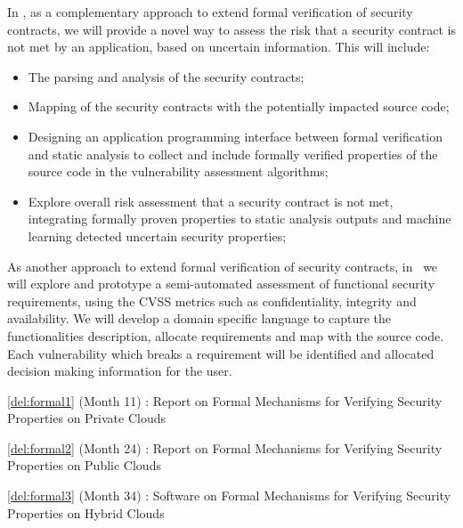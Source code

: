 \begin{Workpackage}{\thewpno}
\begin{Task}
In \theTask, as a complementary approach to extend formal verification of security contracts, we will provide a novel way to assess the risk that a security contract is not met by an application, based on uncertain information. This will include:

\begin{itemize}
\item The parsing and analysis of the security contracts; %
    \item Mapping of the security contracts with the potentially impacted source code;
    \item Designing an application programming interface between formal verification and static analysis to collect and include formally verified properties of the source code in the vulnerability assessment algorithms;
    \item Explore overall risk assessment that a security contract is not met, integrating formally proven properties to static analysis outputs and machine learning detected uncertain security properties;
\end{itemize}

\end{Task}


\begin{Task}

\TaskResults{%
\ref{del:formal1},
\ref{del:formal2},
\ref{del:formal3}
}
\TaskHeader{}

As another approach to extend formal verification of security contracts, in \theTask\ we will explore and prototype a semi-automated assessment of functional security requirements, using the CVSS metrics such as confidentiality, integrity and availability.
We will develop a domain specific language to capture the functionalities description, allocate requirements and map with the source code. Each vulnerability which breaks a requirement will be identified and allocated decision making information for the user.
\end{Task}


\begin{WPDeliverables}
  \begin{compactitem}
  \item \ref{del:formal1} (Month 11) : Report on Formal Mechanisms for Verifying Security Properties on Private Clouds
\item \ref{del:formal2} (Month 24) : Report on Formal Mechanisms for Verifying Security Properties on Public Clouds 
\item \ref{del:formal3} (Month 34) : Software on Formal Mechanisms for Verifying Security Properties on Hybrid Clouds 
\end{compactitem}
\end{WPDeliverables}
\end{Workpackage}
